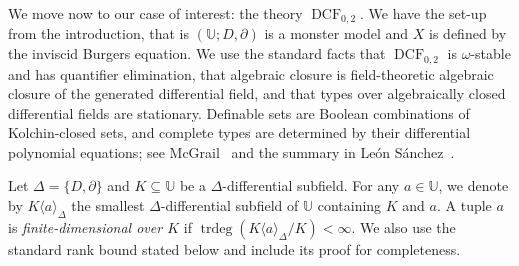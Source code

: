 \documentclass[11pt,a4paper]{amsart}
\theoremstyle{definition}
\newcommand{\DCF}{\operatorname{DCF}}
\newcommand{\trdeg}{\operatorname{trdeg}}
\newcommand{\Ucal}{{\mathds{U}}}
\newcommand{\Uu}{{\mathds{U}}}
\begin{document}
We move now to our case of interest: the theory $\DCF_{0,2}$. We have the set-up from the introduction, that is $(\Ucal;D,\partial)$ is a monster model and $X$ is defined by the inviscid Burgers equation.
We use the standard facts that $\DCF_{0,2}$ is $\omega$-stable and has
quantifier elimination, that algebraic closure is field-theoretic
algebraic closure of the generated differential field, and that types
over algebraically closed differential fields are stationary.
Definable sets are Boolean combinations of Kolchin-closed sets, and
complete types are determined by their differential polynomial
equations; see McGrail~\cite{McGrail} and the summary in
Le\'on S\'anchez~\cite{LS}.

Let $\Delta=\{D,\partial\}$ and $K\subseteq \Uu$ be a $\Delta$-differential subfield. For any $a\in \Uu$, we denote by $K\langle a\rangle_\Delta$ the smallest $\Delta$-differential subfield of $\Uu$ containing $K$ and $a$. A tuple $a$ is \emph{finite-dimensional over $K$} if
$\trdeg(K\langle a\rangle_\Delta/K)<\infty$.
We also use the standard  rank bound stated below and include its proof for completeness.
\end{document}
